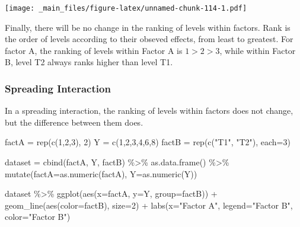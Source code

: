 \documentclass[
]{book}
\newenvironment{Shaded}{\begin{snugshade}}{\end{snugshade}}
\newcommand{\AttributeTok}[1]{\textcolor[rgb]{0.77,0.63,0.00}{#1}}
\newcommand{\DecValTok}[1]{\textcolor[rgb]{0.00,0.00,0.81}{#1}}
\newcommand{\FunctionTok}[1]{\textcolor[rgb]{0.00,0.00,0.00}{#1}}
\newcommand{\NormalTok}[1]{#1}
\newcommand{\OtherTok}[1]{\textcolor[rgb]{0.56,0.35,0.01}{#1}}
\newcommand{\SpecialCharTok}[1]{\textcolor[rgb]{0.00,0.00,0.00}{#1}}
\newcommand{\StringTok}[1]{\textcolor[rgb]{0.31,0.60,0.02}{#1}}
\begin{document}
\texttt{[image: \_main\_files/figure-latex/unnamed-chunk-114-1.pdf]}

Finally, there will be no change in the ranking of levels within factors. Rank is the order of levels according to their obseved effects, from least to greatest. For factor A, the ranking of levels within Factor A is \(1 > 2 > 3\), while within Factor B, level T2 always ranks higher than level T1.

\hypertarget{spreading-interaction}{%
\subsubsection{Spreading Interaction}\label{spreading-interaction}}

In a spreading interaction, the ranking of levels within factors does not change, but the difference between them does.

\begin{Shaded}
\begin{Highlighting}[]
\NormalTok{factA }\OtherTok{=} \FunctionTok{rep}\NormalTok{(}\FunctionTok{c}\NormalTok{(}\DecValTok{1}\NormalTok{,}\DecValTok{2}\NormalTok{,}\DecValTok{3}\NormalTok{), }\DecValTok{2}\NormalTok{)}
\NormalTok{Y }\OtherTok{=} \FunctionTok{c}\NormalTok{(}\DecValTok{1}\NormalTok{,}\DecValTok{2}\NormalTok{,}\DecValTok{3}\NormalTok{,}\DecValTok{4}\NormalTok{,}\DecValTok{6}\NormalTok{,}\DecValTok{8}\NormalTok{)}
\NormalTok{factB }\OtherTok{=} \FunctionTok{rep}\NormalTok{(}\FunctionTok{c}\NormalTok{(}\StringTok{"T1"}\NormalTok{, }\StringTok{"T2"}\NormalTok{), }\AttributeTok{each=}\DecValTok{3}\NormalTok{)}

\NormalTok{dataset }\OtherTok{=} \FunctionTok{cbind}\NormalTok{(factA, Y, factB) }\SpecialCharTok{\%\textgreater{}\%}
  \FunctionTok{as.data.frame}\NormalTok{() }\SpecialCharTok{\%\textgreater{}\%}
  \FunctionTok{mutate}\NormalTok{(}\AttributeTok{factA=}\FunctionTok{as.numeric}\NormalTok{(factA),}
         \AttributeTok{Y=}\FunctionTok{as.numeric}\NormalTok{(Y)) }

\NormalTok{dataset }\SpecialCharTok{\%\textgreater{}\%}
  \FunctionTok{ggplot}\NormalTok{(}\FunctionTok{aes}\NormalTok{(}\AttributeTok{x=}\NormalTok{factA, }\AttributeTok{y=}\NormalTok{Y, }\AttributeTok{group=}\NormalTok{factB)) }\SpecialCharTok{+}
  \FunctionTok{geom\_line}\NormalTok{(}\FunctionTok{aes}\NormalTok{(}\AttributeTok{color=}\NormalTok{factB), }\AttributeTok{size=}\DecValTok{2}\NormalTok{) }\SpecialCharTok{+}
  \FunctionTok{labs}\NormalTok{(}\AttributeTok{x=}\StringTok{"Factor A"}\NormalTok{, }\AttributeTok{legend=}\StringTok{"Factor B"}\NormalTok{, }\AttributeTok{color=}\StringTok{"Factor B"}\NormalTok{)}
\end{Highlighting}
\end{Shaded}
\end{document}
